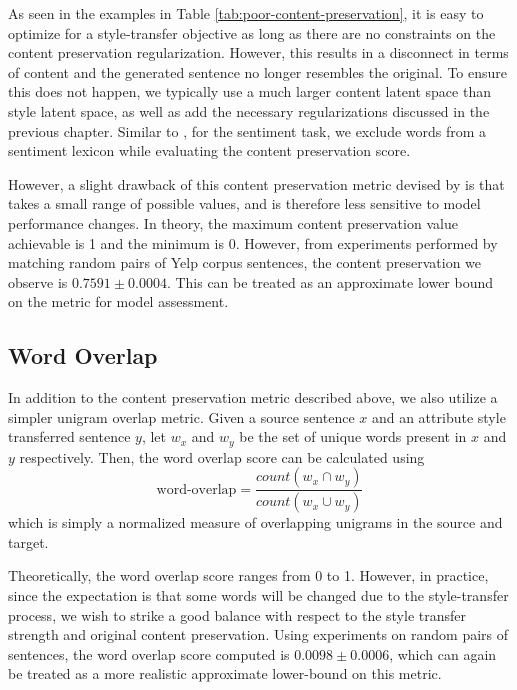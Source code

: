 As seen in the examples in Table \ref{tab:poor-content-preservation}, it is easy to optimize for a style-transfer objective as long as there are no constraints on the content preservation regularization. However, this results in a disconnect in terms of content and the generated sentence no longer resembles the original. To ensure this does not happen, we typically use a much larger content latent space than style latent space, as well as add the necessary regularizations discussed in the previous chapter. Similar to \cite{fu2017style}, for the sentiment task, we exclude words from a sentiment lexicon \citep{hu2004mining} while evaluating the content preservation score.

However, a slight drawback of this content preservation metric devised by \cite{fu2017style} is that takes a small range of possible values, and is therefore less sensitive to model performance changes. In theory, the maximum content preservation value achievable is 1 and the minimum is 0. However, from experiments performed by matching random pairs of Yelp corpus sentences, the content preservation we observe is $0.7591 \pm 0.0004$. This can be treated as an approximate lower bound on the metric for model assessment.

\subsection{Word Overlap}

In addition to the content preservation metric described above, we also utilize a simpler unigram overlap metric. Given a source sentence $x$ and an attribute style transferred sentence $y$, let $w_x$ and $w_y$ be the set of unique words present in $x$ and $y$ respectively. Then, the word overlap score can be calculated using
\begin{equation*}
	\text{word-overlap} = \frac{count(w_x \cap w_y)}{count(w_x \cup w_y)}
\end{equation*}
which is simply a normalized measure of overlapping unigrams in the source and target.

Theoretically, the word overlap score ranges from 0 to 1. However, in practice, since the expectation is that some words will be changed due to the style-transfer process, we wish to strike a good balance with respect to the style transfer strength and original content preservation. Using experiments on random pairs of sentences, the word overlap score computed is $0.0098 \pm 0.0006$, which can again be treated as a more realistic approximate lower-bound on this metric.


